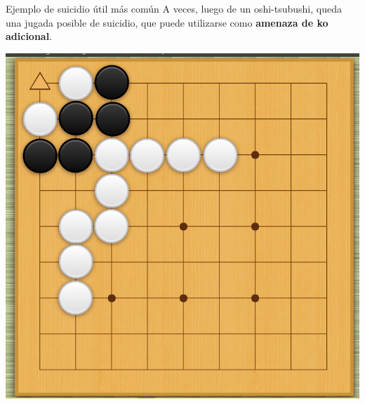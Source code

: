\documentclass{beamer}
\begin{document}
\begin{frame}{Ejemplo de suicidio útil más común}
    A veces, luego de un oshi-tsubushi, queda una jugada posible de suicidio, que puede utilizarse como \textbf{amenaza de ko adicional}.
 
    {\hfill \includegraphics[scale=0.25]{suicidio-amenaza.png} \hfill}
\end{frame}
\end{document}

